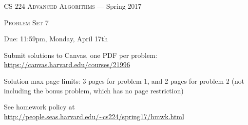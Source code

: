 \documentclass[12pt]{article}
\begin{document}
\thispagestyle{empty}

\begin{center}
{\Large \textsc{CS 224 Advanced Algorithms} --- Spring 2017}

\bigskip

{\Large \textsc{Problem Set 7}}

\smallskip

Due: 11:59pm, Monday, April 17th

\medskip

Submit solutions to Canvas, one PDF per problem: \url{https://canvas.harvard.edu/courses/21996}

\medskip

Solution max page limits: 3 pages for problem 1, and 2 pages for problem 2 (not including the bonus problem, which has no page restriction)

\bigskip

{\footnotesize See homework policy at \url{http://people.seas.harvard.edu/~cs224/spring17/hmwk.html}}
\end{center}
\end{document}
